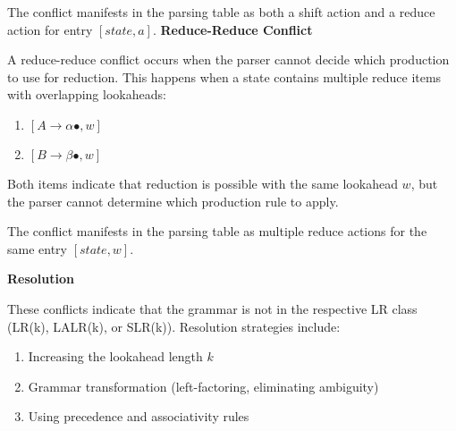 The conflict manifests in the parsing table as both a shift action and a reduce action for entry $[state, a]$.
\textbf{Reduce-Reduce Conflict}

A reduce-reduce conflict occurs when the parser cannot decide which production to use for reduction. This happens when a state contains multiple reduce items with overlapping lookaheads:
\begin{enumerate}
\item $[A \to \alpha \bullet, w]$
\item $[B \to \beta \bullet, w]$
\end{enumerate}

Both items indicate that reduction is possible with the same lookahead $w$, but the parser cannot determine which production rule to apply.

The conflict manifests in the parsing table as multiple reduce actions for the same entry $[state, w]$.

\textbf{Resolution}

These conflicts indicate that the grammar is not in the respective LR class (LR(k), LALR(k), or SLR(k)). Resolution strategies include:
\begin{enumerate}
\item Increasing the lookahead length $k$
\item Grammar transformation (left-factoring, eliminating ambiguity)
\item Using precedence and associativity rules
\end{enumerate}
